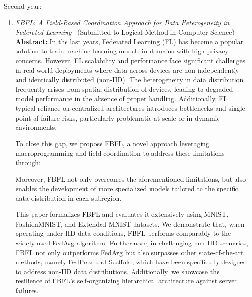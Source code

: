 \documentclass[runningheads]{llncs}
\begin{document}
\noindent
Second year:
\begin{enumerate}
    \item \emph{FBFL: A Field-Based Coordination Approach for Data Heterogeneity in Federated Learning}~\cite{DBLP:journals/corr/abs-2502-08577} (Submitted to Logical Method in Computer Science)\\
    \textbf{Abstract: }
    In the last years, Federated Learning (FL) has become a popular solution to train machine learning models
     in domains with high privacy concerns.
    However, 
     FL scalability and performance face significant challenges 
     in real-world deployments where data across devices are non-independently and identically 
     distributed (non-IID).
    The heterogeneity in data distribution frequently arises from spatial distribution of devices,
     leading to degraded model performance in the absence of proper handling.
    Additionally, 
     FL typical reliance on centralized architectures introduces bottlenecks
     and single-point-of-failure risks, particularly problematic at scale or in dynamic environments.

    To close this gap, 
     we propose FBFL, a novel approach leveraging 
     macroprogramming and field coordination to address these limitations through:
    Moreover, FBFL not only overcomes the aforementioned limitations, but also enables the development 
     of more specialized models tailored to the specific data distribution in each subregion.

    This paper formalizes FBFL and evaluates it extensively using 
     MNIST, FashionMNIST, and Extended MNIST datasets. 
    We demonstrate that, when operating under IID data conditions, FBFL performs 
     comparably to the widely-used FedAvg algorithm.
    Furthermore, in challenging non-IID scenarios, FBFL not only outperforms FedAvg but also 
     surpasses other state-of-the-art methods, namely FedProx and Scaffold, which have been 
     specifically designed to address non-IID data distributions.
    Additionally, we showcase the resilience of FBFL's self-organizing hierarchical architecture against server failures.


\end{enumerate}
\end{document}
